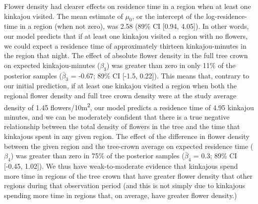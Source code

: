 \documentclass[twoside,12pt,final]{ucthesis-CA2012}
\begin{document}
\begin{ucmainmatter}
Flower density had clearer effects on residence time in a region when at least one kinkajou visited. The mean estimate of \(\mu_0\), or the intercept of the log-residence-time in a region (when not zero), was 2.58 (89\% CI {[}0.94, 4.05{]}). In other words, our model predicts that if at least one kinkajou visited a region with no flowers, we could expect a residence time of approximately thirteen kinkajou-minutes in the region that night. The effect of absolute flower density in the full tree crown on expected kinkajou-minutes (\(\beta_3\)) was greater than zero in only 11\% of the posterior samples (\(\bar\beta_3\) = -0.67; 89\% CI {[}-1.5, 0.22{]}). This means that, contrary to our initial prediction, if at least one kinkajou visited a region when both the regional flower density and full tree crown density were at the study average density of 1.45 flowers/10m\textsuperscript{2}, our model predicts a residence time of 4.95 kinkajou minutes, and we can be moderately confident that there is a true negative relationship between the total density of flowers in the tree and the time that kinkajous spent in any given region. The effect of the difference in flower density between the given region and the tree-crown average on expected residence time (\(\beta_4\)) was greater than zero in 75\% of the posterior samples (\(\bar\beta_4\) = 0.3; 89\% CI {[}-0.45, 1.02{]}). We thus have weak-to-moderate evidence that kinkajous spend more time in regions of the tree crown that have greater flower density that other regions during that observation period (and this is not simply due to kinkajous spending more time in regions that, on average, have greater flower density.)


\end{ucmainmatter}
\end{document}
